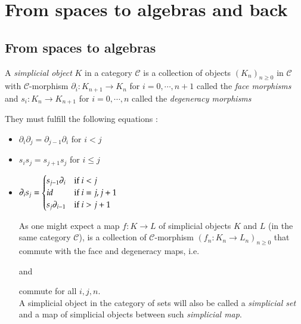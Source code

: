 
 \section{From spaces to algebras and back}
 
 \subsection{From spaces to algebras}
 
 \begin{Definition}
  A \emph{simplicial object} $K$ in a category $\mathscr{C}$ %
  is a collection of objects $(K_n)_{n \geq 0}$ in $\mathscr{C}$ with $\mathscr{C}$-morphism
  $\partial_i \colon K_{n+1} \to K_n$ for $i = 0, \cdots, n+1$ called the \emph{face morphisms} and \newline
  $s_i \colon K_n \to K_{n+1}$ for $i = 0, \cdots, n$ called the \emph{degeneracy morphisms}
  
  They must fulfill the following equations : %
  \begin{itemize}
   \item $\partial_i \partial_j = \partial_{j-1} \partial_i$ for $i < j$
   \item  $s_i s_j = s_{j+1} s_j$ for $ i \leq j$
   \item $ \partial_i s_j = \begin{cases}
              s_{j-1} \partial_i 	&\text{if $i < j$} \\
              id 	&\text{if $i = j, j+1$} \\
              s_j \partial_{i-1}	 &\text{if $ i > j + 1$}
             
             \end{cases}
    $	
    
    As one might expect a map $f \colon K \to L$ of simplicial objects $K$ and $L$ (in the same category $\mathscr{C}$), is a collection
    of $\mathscr{C}$-morphism $( f_n \colon K_n \to L_n)_{ n \geq 0}$ that commute with the face and degeneracy maps, i.e.
    \begin{multicols}{3}
     \columnbreak
    \begin{center}
     and
    \end{center}
    \columnbreak
    \end{multicols}
    
    
    
    commute for all $i,j,n$. \\
   A simplicial object in the category of sets will also be called a \emph{simplicial set} and a map 
   of simplicial objects between such \emph{simplicial map}.
  \end{itemize}
 \end{Definition}

